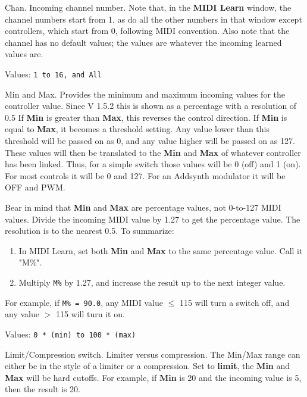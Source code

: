    Chan.
   Incoming channel number.
   Note that, in the \textbf{MIDI Learn} window, the channel numbers start
   from 1,  as do all the other numbers in that window except controllers, which
   start from 0, following MIDI convention.
   Also note that the channel has no default values; the values are whatever the
   incoming learned values are.

   Values: \texttt{1 to 16, and All}

   Min and Max.
   Provides the minimum and maximum incoming values for the controller value.
   Since V 1.5.2 this is shown as a percentage with a resolution of 0.5
   If \textbf{Min} is greater than \textbf{Max}, this reverses the control
   direction.
   If \textbf{Min} is equal to \textbf{Max}, it becomes a threshold setting.
   Any value lower than this threshold will be passed on as 0, and any
   value higher will be passed on as 127.
   These values will then be translated to the
   \textbf{Min} and \textbf{Max} of whatever
   controller has been linked. Thus, for a simple switch those values
   will be 0 (off) and 1 (on). For most controls it will be 0 and 127.
   For an Addsynth modulator it will be OFF and PWM.

   Bear in mind that \textbf{Min} and \textbf{Max} are percentage values, not
   0-to-127 MIDI values.  Divide the incoming MIDI value by 1.27 to get the
   percentage value.  The resolution is to the nearest 0.5.
   To summarize:

   \begin{enumerate}
      \item In MIDI Learn, set both \textbf{Min} and \textbf{Max} to the same
         percentage value.  Call it "M\%".
      \item Multiply \texttt{M\%} by 1.27, and increase the result up to the
         next integer value.
   \end{enumerate}

   For example, if \texttt{M\% = 90.0}, any MIDI value $\leq$ 115 will turn a
   switch off, and any value $>$ 115 will turn it on.

   Values: \texttt{0 * (min) to 100 * (max)}

   Limit/Compression switch.
   Limiter versus compression.
   The Min/Max range can either be in the style of a limiter or a compression.
   Set to \textbf{limit}, the \textbf{Min} and \textbf{Max} will be hard
   cutoffs.
   For example, if \textbf{Min} is 20 and the incoming value is 5, then the
   result is 20.

